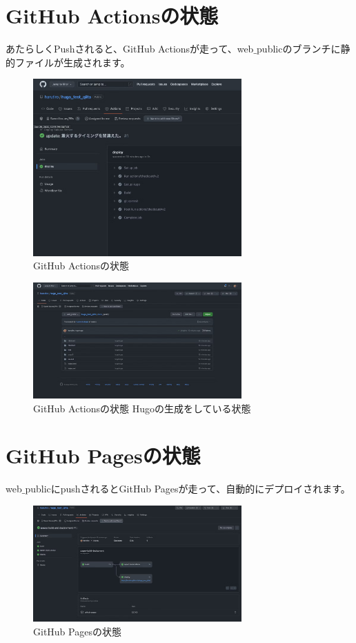 \section{GitHub Actionsの状態}
  あたらしくPushされると、GitHub Actionsが走って、web$\_$publicのブランチに静的ファイルが生成されます。

  \begin{figure}[H]
    \centering
    \includegraphics[width=8cm]{./image/02-chap9/git-action1.png}
    \caption{GitHub Actionsの状態}
    \label{chap9-git-action1-image}
  \end{figure}

  \begin{figure}[H]
    \centering
    \includegraphics[width=8cm]{./image/02-chap9/git-action2.png}
    \caption{GitHub Actionsの状態 Hugoの生成をしている状態}
    \label{chap9-git-action2-image}
  \end{figure}

\section{GitHub Pagesの状態}
  web$\_$publicにpushされるとGitHub Pagesが走って、自動的にデプロイされます。

  \begin{figure}[H]
    \centering
    \includegraphics[width=8cm]{./image/02-chap9/git-pases.png}
    \caption{GitHub Pagesの状態}
    \label{chap9-git-pases-image}
  \end{figure}

